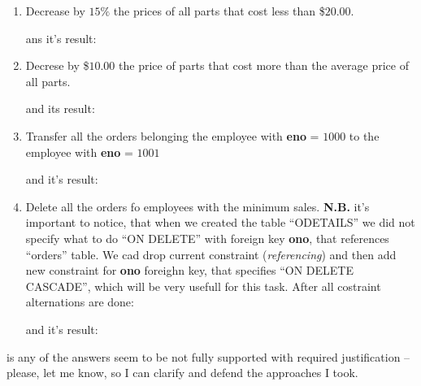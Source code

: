 \documentclass{article}
\newenvironment{answer}%
{\begin{framed}%
\vspace{0.5cm}}%
{\end{framed}\vspace{0.5cm}}
\begin{document}
\begin{answer}
\begin{enumerate}
			\begin{enumerate}
				\item Decrease by $15\%$ the prices of all parts that cost less than \$$20.00$.
				

				ans it's result:
				

				\setcounter{enumii}{2}
				\item Decrese by \$$10.00$ the price of parts that cost more than the average price of all parts.
				

				and its result:
				


				\item Transfer all the orders belonging the employee with \textbf{eno} = $1000$ to the employee with \textbf{eno} = $1001$
				

				and it's result:
				

				\setcounter{enumii}{5}
				\item Delete all the orders fo employees with the minimum sales. \textbf{N.B.} it's important to notice, that when we created the table ``ODETAILS'' we did not specify what to do ``ON DELETE'' with foreign key \textbf{ono}, that references ``orders'' table. We cad drop current constraint (\emph{referencing}) and then add new constraint for \textbf{ono} foreighn key, that specifies ``ON DELETE CASCADE'', which will be very usefull for this task. After all costraint alternations are done:

				

				and it's result:
								
			\end{enumerate}
		\end{enumerate}
	\end{answer}

	is any of the answers seem to be not fully supported with required justification -- please, let me know, so I can clarify and defend the approaches I took.
\end{document}
